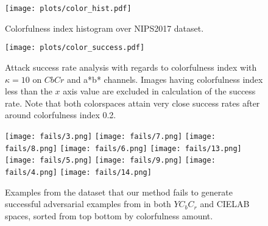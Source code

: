 
\begin{figure}[t]

    \begin{center}
        \texttt{[image: plots/color\_hist.pdf]}
    \end{center}
    \caption{Colorfulness index histogram over NIPS2017 dataset.}\label{fig:hist}
\end{figure}
\begin{figure}[t]
    \begin{center}
        \texttt{[image: plots/color\_success.pdf]}
    \end{center}
    \caption[Attack success rate analysis with regards to colorfulness index with \(\kappa=10\) on \(CbCr\) and a*b* channels.]{Attack success rate analysis with regards to colorfulness index with \(\kappa=10\) on \(CbCr\) and a*b* channels. Images having colorfulness index less than the \(x\) axis value are excluded in calculation of the success rate. Note that both colorspaces attain very close success rates after around colorfulness index 0.2.} \label{fig:plots}
\end{figure}


\begin{figure}[t]
    \texttt{[image: fails/3.png]}
    \texttt{[image: fails/7.png]}
    \texttt{[image: fails/8.png]}
    \texttt{[image: fails/6.png]}
    \texttt{[image: fails/13.png]}
    \texttt{[image: fails/5.png]}
    \texttt{[image: fails/9.png]}
    \texttt{[image: fails/4.png]}
    \texttt{[image: fails/14.png]}
    \caption[Examples from the dataset that our method fails to generate successful adversarial examples from in both \(YC_{b}C_{r}\) and CIELAB spaces]{Examples from the dataset that our method fails to generate successful adversarial examples from in both \(YC_{b}C_{r}\) and CIELAB spaces, sorted from top bottom by colorfulness amount.}\label{fig:fails}
\end{figure}


